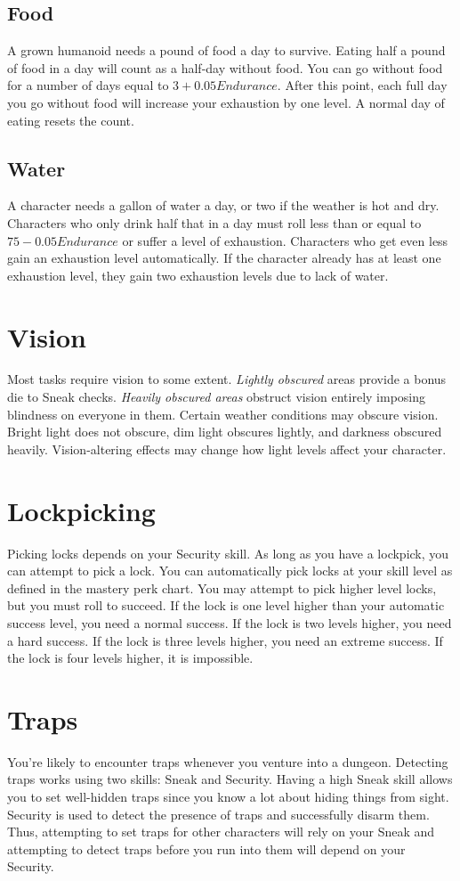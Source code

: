 \subsection{Food}
A grown humanoid needs a pound of food a day to survive. Eating half a pound of food in a day will count as a half-day without food. You can go without food for a number of days equal to $3+0.05Endurance$. After this point, each full day you go without food will increase your exhaustion by one level. A normal day of eating resets the count.

\subsection{Water}
A character needs a gallon of water a day, or two if the weather is hot and dry. Characters who only drink half that in a day must roll less than or equal to $75-0.05Endurance$ or suffer a level of exhaustion. Characters who get even less gain an exhaustion level automatically. If the character already has at least one exhaustion level, they gain two exhaustion levels due to lack of water.

\section{Vision}
Most tasks require vision to some extent. \textit{Lightly obscured} areas provide a bonus die to Sneak checks. \textit{Heavily obscured areas} obstruct vision entirely imposing blindness on everyone in them. Certain weather conditions may obscure vision. Bright light does not obscure, dim light obscures lightly, and darkness obscured heavily. Vision-altering effects may change how light levels affect your character.

\section{Lockpicking}
Picking locks depends on your Security skill. As long as you have a lockpick, you can attempt to pick a lock. You can automatically pick locks at your skill level as defined in the mastery perk chart. You may attempt to pick higher level locks, but you must roll to succeed. If the lock is one level higher than your automatic success level, you need a normal success. If the lock is two levels higher, you need a hard success. If the lock is three levels higher, you need an extreme success. If the lock is four levels higher, it is impossible.

\section{Traps}
You're likely to encounter traps whenever you venture into a dungeon. Detecting traps works using two skills: Sneak and Security. Having a high Sneak skill allows you to set well-hidden traps since you know a lot about hiding things from sight. Security is used to detect the presence of traps and successfully disarm them. Thus, attempting to set traps for other characters will rely on your Sneak and attempting to detect traps before you run into them will depend on your Security.

